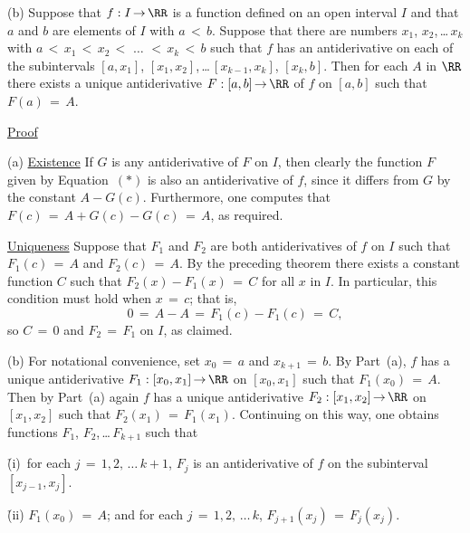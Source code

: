 \V

        (b) Suppose that $f:I \,{\rightarrow}\, {\RR}$ is a function defined on an open interval $I$ and that $a$ and $b$ are elements of $I$ with $a\,<\,b$.
    Suppose that there are numbers $x_{1}$, $x_{2}$,\,{\ldots}\,$x_{k}$ with $a\,<\,x_{1}\,<\,x_{2}\,<\,\,{\ldots}\,\,<\,x_{k}\,<\,b$ such that $f$ has an antiderivative on each of the subintervals $[a,x_{1}]$, $[x_{1},x_{2}]$,\,{\ldots}\,$[x_{k-1},x_{k}]$, $[x_{k},b]$.
    Then for each $A$ in ${\RR}$ there exists a unique antiderivative $F:[a,b] \,{\rightarrow}\, {\RR}$ of $f$ on $[a,b]$ such that $F(a) \,=\, A$.
\V

        \underline{Proof}

        (a) \underline{Existence} If $G$ is any antiderivative of $F$ on $I$, then clearly the function $F$ given by Equation~$({\ast})$ is also an antiderivative of $f$, since it differs from $G$ by the constant $A-G(c)$.
    Furthermore, one computes that $F(c) \,=\, A+G(c)-G(c) \,=\, A$, as required.

        \underline{Uniqueness} Suppose that $F_{1}$ and $F_{2}$ are both antiderivatives of $f$ on $I$ such that $F_{1}(c) \,=\, A$ and $F_{2}(c) \,=\, A$.
    By the preceding theorem there exists a constant function $C$ such that $F_{2}(x) - F_{1}(x) \,=\, C$ for all $x$ in $I$.
    In particular, this condition must hold when $x \,=\, c$; that is,
        \begin{displaymath}
        0 \,=\, A-A \,=\, F_{1}(c)-F_{1}(c) \,=\, C,
        \end{displaymath}
    so $C \,=\, 0$ and $F_{2} \,=\, F_{1}$ on $I$, as claimed.

\V

        (b) For notational convenience, set $x_{0} \,=\, a$ and $x_{k+1} \,=\, b$.
    By Part~(a), $f$ has a unique antiderivative $F_{1}:[x_{0},x_{1}] \,{\rightarrow}\, {\RR}$ on $[x_{0},x_{1}]$ such that $F_{1}(x_{0}) \,=\, A$.
     Then by Part~(a) again $f$ has a unique antiderivative $F_{2}:[x_{1},x_{2}] \,{\rightarrow}\, {\RR}$ on $[x_{1},x_{2}]$ such that $F_{2}(x_{1}) \,=\, F_{1}(x_{1})$.
    Continuing on this way, one obtains functions $F_{1}$, $F_{2}$,\,{\ldots}\,$F_{k+1}$ such that

        \h (i)\, for each $j \,=\, 1,2,\,{\ldots}\,k+1$, $F_{j}$ is an antiderivative of $f$ on the subinterval $[x_{j-1},x_{j}]$.

        \h (ii) $F_{1}(x_{0}) \,=\, A$; and for each $j \,=\, 1,2,\,{\ldots}\,k$, $F_{j+1}(x_{j}) \,=\, F_{j}(x_{j})$.

